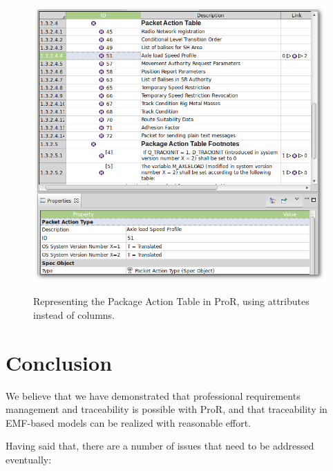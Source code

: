 \documentclass{template/openetcs_report}
\begin{document}
\begin{figure}[h!]
	\begin{center}
	\includegraphics[width=.8\textwidth]{img/packet-action-table.png}
	\label{fig:packet-action-table}
	\end{center}
	\caption{Representing the Package Action Table in ProR, using attributes instead of columns.}
\end{figure}

\chapter{Conclusion}

We believe that we have demonstrated that professional requirements management and traceability is possible with ProR, and that traceability in EMF-based models can be realized with reasonable effort.

Having said that, there are a number of issues that need to be addressed eventually:
\end{document}
